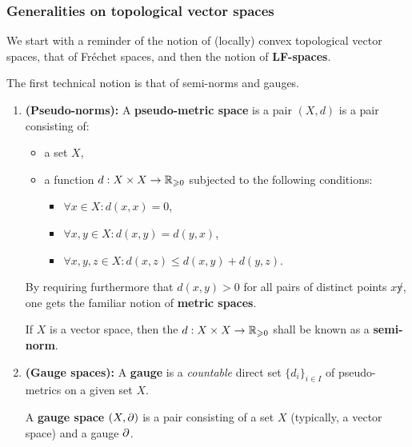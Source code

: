         \subsubsection{Generalities on topological vector spaces}
            We start with a reminder of the notion of (locally) convex topological vector spaces, that of Fr\'echet spaces, and then the notion of \textbf{LF-spaces}.
            
            The first technical notion is that of semi-norms and gauges.
            \begin{definition} \label{def: seminorms_and_gauges}
                \noindent
                \begin{enumerate}
                    \item \textbf{(Pseudo-norms):} A \textbf{pseudo-metric space} is a pair $(X, d)$ is a pair consisting of:
                        \begin{itemize}
                            \item a set $X$,
                            \item a function $d: X \x X \to \R_{\geq 0}$ subjected to the following conditions:
                                \begin{itemize}
                                    \item $\forall x \in X: d(x, x) = 0$,
                                    \item $\forall x, y \in X: d(x, y) = d(y, x)$,
                                    \item $\forall x, y, z \in X: d(x, z) \leq d(x, y) + d(y, z)$.
                                \end{itemize}
                        \end{itemize}
                    By requiring furthermore that $d(x, y) > 0$ for all pairs of distinct points $x \not y$, one gets the familiar notion of \textbf{metric spaces}.
                    
                    If $X$ is a vector space, then the $d: X \x X \to \R_{\geq 0}$ shall be known as a \textbf{semi-norm}.
                    \item \textbf{(Gauge spaces):} A \textbf{gauge} is a \textit{countable} direct set $\{d_i\}_{i \in I}$ of pseudo-metrics on a given set $X$. 
                    
                    A \textbf{gauge space} $(X, \partial)$ is a pair consisting of a set $X$ (typically, a vector space) and a gauge $\partial$.
                \end{enumerate}
            \end{definition}

